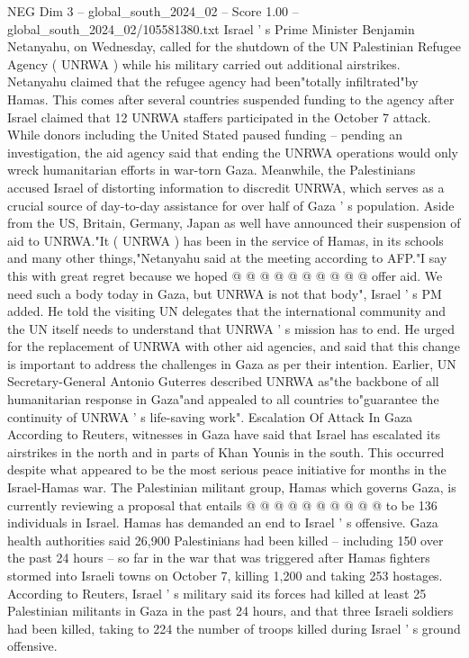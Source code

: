 \begin{textsample}{NEG Dim 3 – global\_south\_2024\_02 – Score 1.00 – global\_south\_2024\_02/105581380.txt}  \label{ex:f3_neg_093}
Israel ' s Prime Minister Benjamin Netanyahu, on Wednesday, called for the shutdown of the UN Palestinian Refugee Agency ( UNRWA ) while his military carried out additional airstrikes.
Netanyahu claimed that the refugee agency had been"totally infiltrated"by Hamas.
This comes after several countries suspended funding to the agency after Israel claimed that 12 UNRWA staffers participated in the October 7 attack.
While donors including the United Stated paused funding -- pending an investigation, the aid agency said that ending the UNRWA operations would only wreck humanitarian efforts in war-torn Gaza.
Meanwhile, the Palestinians accused Israel of distorting information to discredit UNRWA, which serves as a crucial source of day-to-day assistance for over half of Gaza ' s population.
Aside from the US, Britain, Germany, Japan as well have announced their suspension of aid to UNRWA."It ( UNRWA ) has been in the service of Hamas, in its schools and many other things,"Netanyahu said at the meeting according to AFP."I say this with great regret because we hoped @ @ @ @ @ @ @ @ @ @ offer aid.
We need such a body today in Gaza, but UNRWA is not that body", Israel ' s PM added.
He told the visiting UN delegates that the international community and the UN itself needs to understand that UNRWA ' s mission has to end.
He urged for the replacement of UNRWA with other aid agencies, and said that this change is important to address the challenges in Gaza as per their intention.
Earlier, UN Secretary-General Antonio Guterres described UNRWA as"the backbone of all humanitarian response in Gaza"and appealed to all countries to"guarantee the continuity of UNRWA ' s life-saving work".
Escalation Of Attack In Gaza According to Reuters, witnesses in Gaza have said that Israel has escalated its airstrikes in the north and in parts of Khan Younis in the south.
This occurred despite what appeared to be the most serious peace initiative for months in the Israel-Hamas war.
The Palestinian militant group, Hamas which governs Gaza, is currently reviewing a proposal that entails @ @ @ @ @ @ @ @ @ @ to be 136 individuals in Israel.
Hamas has demanded an end to Israel ' s offensive.
Gaza health authorities said 26,900 Palestinians had been killed -- including 150 over the past 24 hours -- so far in the war that was triggered after Hamas fighters stormed into Israeli towns on October 7, killing 1,200 and taking 253 hostages.
According to Reuters, Israel ' s military said its forces had killed at least 25 Palestinian militants in Gaza in the past 24 hours, and that three Israeli soldiers had been killed, taking to 224 the number of troops killed during Israel ' s ground offensive.

\end{textsample}
